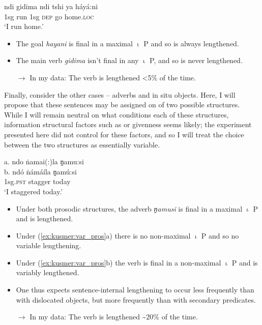 \documentclass[output=paper,modfonts,nonflat,hidelinks]{langsci/langscibook}
\begin{document}
\ea \label{ex:kusmer:sec_pros}
\gll {\lipm} ndi gidima {\lipn} ndi tshi ya háyá:ni {\ripn} {\ripm}\\
{} 1sg run {} 1sg \textsc{dep} go home.\textsc{loc} {} {}\\
	\glt `I run home.'
	\z

\begin{itemize}

	\item The goal \textit{hayani} is final in a maximal  $\upiota$ P and so is always
		lengthened.

	\item The main verb \textit{gidima} isn't final in any $\upiota$ P, and so is never lengthened.
	\item[$\rightarrow$] In my data: The verb is lengthened <5\% of the time.
\end{itemize}

Finally, consider the other cases -- adverbs and  {in situ} objects.
Here, I will propose that these sentences may be assigned on of two possible
structures. While I will remain neutral on what conditions each of these
structures, information structural factors such as  or givenness seems
likely; the experiment presented here did not control for these factors, and so
I will treat the choice between the two structures as essentially variable.



\ea \label{ex:kusmer:var_pros} 
\glll a. {\hspace{1em}} {\lipm} {\lipn} ndo ṅamai(:)la {\ripn} ṋamu:si {\ripm}\\
b. {} {\lipm} {} ndó ṅámáíla {} ṋamú:si {\ripm}\\
{} {} {} {} 1sg.\textsc{pst} stagger {} today {}\\
		\glt  `I staggered today.'
\z

		  \begin{itemize}
	\item Under both prosodic structures, the adverb \textit{ṋamusi} is final in a
		maximal $\upiota$ P and is lengthened.
	\item Under (\ref{ex:kusmer:var_pros}a) there is no non-maximal $\upiota$ P and so no variable
		lengthening.
	\item Under (\ref{ex:kusmer:var_pros}b) the verb is final in a non-maximal $\upiota$ P and is
		variably lengthened.
	\item One thus expects sentence-internal lengthening to occur less frequently
		than with dislocated objects, but more frequently than with secondary
		predicates.
	\item[$\rightarrow$] In my data: The verb is lengthened \textasciitilde 20\%
		of the time.

\end{itemize}
\end{document}
